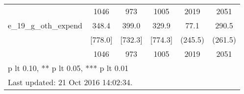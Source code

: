 \begin{table}[htbp]
\begin{tabular*}{0.9\hsize}{@{\hskip\tabcolsep\extracolsep\fill}l*{1}{ccccc}}
                                &     1046&      973&     1005&     2019         &     2051         \\
e\_19\_g\_oth\_expend               &    348.4&    399.0&    329.9&     77.1         &    290.5         \\
                                &  [778.0]&  [732.3]&  [774.3]&  (245.5)         &  (261.5)         \\
                                &     1046&      973&     1005&     2019         &     2051         \\
\bottomrule
\multicolumn{6}{l}{\footnotesize * p lt 0.10, ** p lt 0.05, *** p lt 0.01}\\
\multicolumn{6}{l}{\footnotesize Last updated: 21 Oct 2016 14:02:34.}\\
\end{tabular*}
\end{table}

